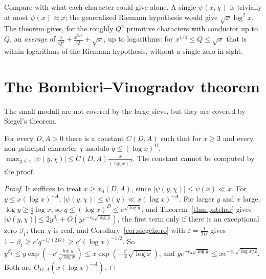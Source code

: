 Compare with what each character could give alone. A single $\psi(x,\chi)$ is trivially at most $\psi(x)\approx x$; the generalised Riemann hypothesis would give $\sqrt x\log^2x$. The theorem gives, for the roughly $Q^2$ primitive characters with conductor up to $Q$, an \emph{average} of $\frac{x}{Q^2}+\frac{x^{5/6}}Q+\sqrt x$, up to logarithms: for $x^{1/4}\le Q\le\sqrt x$ that is within logarithms of the Riemann hypothesis, without a single zero in sight.

\section{The Bombieri--Vinogradov theorem}

The small moduli are not covered by the large sieve, but they are covered by Siegel's theorem.

\begin{lemma}\label{lem:smallq}
For every $D,A>0$ there is a constant $C(D,A)$ such that for $x\ge3$ and every non-principal character $\chi$ modulo $q\le(\log x)^D$, $\max_{y\le x}|\psi(y,\chi)|\le C(D,A)\frac x{(\log x)^A}$. The constant cannot be computed by the proof.
\end{lemma}
\begin{proof}
It suffices to treat $x\ge x_0(D,A)$, since $|\psi(y,\chi)|\le\psi(x)\ll x$. For $y\le x(\log x)^{-A}$, $|\psi(y,\chi)|\le\psi(y)\ll x(\log x)^{-A}$. For larger $y$ and $x$ large, $\log y\ge\frac12\log x$, so $q\le(\log x)^D\le e^{\sqrt{\log y}}$, and Theorem~\ref{thm:pntchar} gives $|\psi(y,\chi)|\le2y^{\beta_1}+O(ye^{-c_3\sqrt{\log y}})$, the first term only if there is an exceptional zero $\beta_1$; then $\chi$ is real, and Corollary~\ref{cor:siegelzero} with $\varepsilon=\frac1{2D}$ gives $1-\beta_1\ge c'q^{-1/(2D)}\ge c'(\log x)^{-1/2}$. So $y^{\beta_1}\le y\exp(-c'\frac{\log y}{\sqrt{\log x}})\le x\exp(-\frac{c'}2\sqrt{\log x})$, and $ye^{-c_3\sqrt{\log y}}\le xe^{-c_3\sqrt{\log x/2}}$. Both are $O_{D,A}(x(\log x)^{-A})$.
\end{proof}


